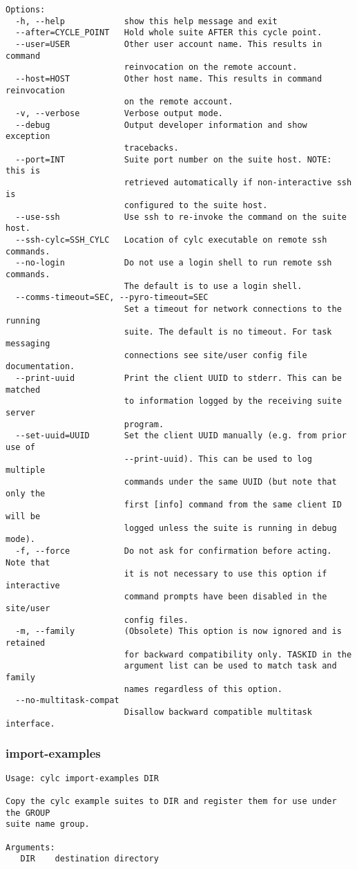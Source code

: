 \begin{lstlisting}
Options:
  -h, --help            show this help message and exit
  --after=CYCLE_POINT   Hold whole suite AFTER this cycle point.
  --user=USER           Other user account name. This results in command
                        reinvocation on the remote account.
  --host=HOST           Other host name. This results in command reinvocation
                        on the remote account.
  -v, --verbose         Verbose output mode.
  --debug               Output developer information and show exception
                        tracebacks.
  --port=INT            Suite port number on the suite host. NOTE: this is
                        retrieved automatically if non-interactive ssh is
                        configured to the suite host.
  --use-ssh             Use ssh to re-invoke the command on the suite host.
  --ssh-cylc=SSH_CYLC   Location of cylc executable on remote ssh commands.
  --no-login            Do not use a login shell to run remote ssh commands.
                        The default is to use a login shell.
  --comms-timeout=SEC, --pyro-timeout=SEC
                        Set a timeout for network connections to the running
                        suite. The default is no timeout. For task messaging
                        connections see site/user config file documentation.
  --print-uuid          Print the client UUID to stderr. This can be matched
                        to information logged by the receiving suite server
                        program.
  --set-uuid=UUID       Set the client UUID manually (e.g. from prior use of
                        --print-uuid). This can be used to log multiple
                        commands under the same UUID (but note that only the
                        first [info] command from the same client ID will be
                        logged unless the suite is running in debug mode).
  -f, --force           Do not ask for confirmation before acting. Note that
                        it is not necessary to use this option if interactive
                        command prompts have been disabled in the site/user
                        config files.
  -m, --family          (Obsolete) This option is now ignored and is retained
                        for backward compatibility only. TASKID in the
                        argument list can be used to match task and family
                        names regardless of this option.
  --no-multitask-compat
                        Disallow backward compatible multitask interface.
\end{lstlisting}
\subsubsection{import-examples}
\label{import-examples}
\begin{lstlisting}
Usage: cylc import-examples DIR

Copy the cylc example suites to DIR and register them for use under the GROUP
suite name group.

Arguments:
   DIR    destination directory
\end{lstlisting}
